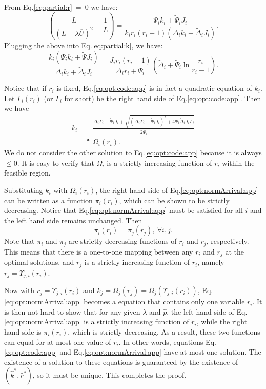 \documentclass[journal]{IEEEtran}
\newcommand{\dimVec}{\hat{k}}
\newcommand{\compVec}{\hat{p}}
\newcommand{\rateVec}{\hat{r}}
\newcommand{\aveUsage}{\overline{U}}
\newcommand{\fixedDelta}{\overline{\Delta}}
\newcommand{\linearDelta}{\widetilde{\Delta}}
\newcommand{\fixedExp}{\overline{\Psi}}
\newcommand{\linearExp}{\widetilde{\Psi}}
\newcommand{\optSolution}{$(\dimVec^*,\rateVec^*)$\xspace}
\newcommand{\FR}{\Gamma}
\newcommand{\KR}{\Omega}
\newcommand{\RR}{\Upsilon}
\begin{document}
\begin{IEEEproof}
From Eq.\ref{eq:partial:r}~=~0 we have:
\begin{equation}
\left(\frac{L}{(L-\lambda \aveUsage)^2} - \frac{1}{L}\right)
= \frac{ \fixedExp_i k_i + \linearExp_i J_i}{k_i r_i (r_i-1) (\fixedDelta_i k_i + \linearDelta_i J_i)}.
\label{eq:opt:normArrival:app}
\end{equation}
Plugging the above into Eq.\ref{eq:partial:k}, we have:
\begin{equation}
\frac{k_i(\fixedExp_i k_i  + \linearExp J_i)}{\fixedDelta_i k_i + \linearDelta_i J_i} 
= \frac{J_i r_i(r_i-1)}{\fixedDelta_i r_i + \fixedExp_i}\left(\linearDelta_i + \linearExp_i\ln\frac{r_i}{r_i-1}\right).
\label{eq:opt:code:app}
\end{equation}

Notice that if $r_i$ is fixed, Eq.\ref{eq:opt:code:app} is in fact a quadratic equation of $k_i$. 
Let $\FR_i(r_i)$ (or $\FR_i$ for short) be the right hand side of Eq.\ref{eq:opt:code:app}. Then we have
\begin{align}
k_i &= \frac{\fixedDelta_i \FR_i - \linearExp_i J_i + \sqrt{(\fixedDelta_i \FR_i - \linearExp_i J_i)^2 + 4\fixedExp_i \linearDelta_i J_i \FR_i }}{2\fixedExp_i}
\\
&\triangleq \KR_i(r_i).
\end{align}
We do not consider the other solution to Eq.\ref{eq:opt:code:app} because it is always $\le 0$.
It is easy to verify that $\KR_i$ is a strictly increasing function of $r_i$ within the feasible region. 


Substituting $k_i$ with $\KR_i(r_i)$, the right hand side of Eq.\ref{eq:opt:normArrival:app} can be written as a function $\pi_i(r_i)$, which can be shown to be strictly decreasing. Notice that Eq.\ref{eq:opt:normArrival:app} must be satisfied for all $i$ and the left hand side remains unchanged. Then
\begin{equation}
\pi_i(r_i) = \pi_j(r_j),~\forall i,j.
\label{eq:pi:constant}
\end{equation}
Note that $\pi_i$ and $\pi_j$ are strictly decreasing functions of $r_i$ and $r_j$, respectively. This means that there is a one-to-one mapping between any $r_i$ and $r_j$ at the optimal solutions, and $r_j$ is a strictly increasing function of $r_i$, namely $r_j = \RR_{j,i}(r_i)$. 

Now with $r_j = \RR_{j,i}(r_i)$ and $k_j = \KR_j(r_j) = \KR_j(\RR_{j,i}(r_i))$, Eq.\ref{eq:opt:normArrival:app} becomes a equation that contains only one variable $r_i$. It is then not hard to show that for any given $\lambda$ and $\compVec$, the left hand side of Eq.\ref{eq:opt:normArrival:app} is a strictly increasing function of $r_i$, while the right hand side is $\pi_i(r_i)$, which is strictly decreasing. As a result, these two functions can equal for at most one value of $r_i$. In other words, equations Eq.\ref{eq:opt:code:app} and Eq.\ref{eq:opt:normArrival:app} have at most one solution. The existence of a solution to these equations is guaranteed by the existence of \optSolution, so it must be unique. This completes the proof.
\end{IEEEproof}
\end{document}
